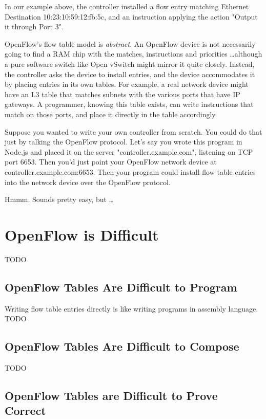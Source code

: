 In our example above, the controller installed a flow entry matching Ethernet Destination 10:23:10:59:12:fb:5c, 
and an instruction applying the action "Output it through Port 3".

OpenFlow's flow table model is \textit{abstract}.
An OpenFlow device is not necessarily going to find a RAM chip with the matches, 
instructions and priorities \ldots although a pure software switch like Open vSwitch might mirror it quite closely.
Instead, the controller asks the device to install entries, and the device accommodates it by placing entries in its
own tables.
For example, a real network device might have an L3 table that matches subnets with the various ports that have
IP gateways.
A programmer, knowing this table exists, can write instructions that match on those ports, and place it directly in the
table accordingly.

Suppose you wanted to write your own controller from scratch.  
You could do that just by talking the OpenFlow protocol.
Let's say you wrote this program in Node.js and placed it on the server "controller.example.com", 
listening on TCP port 6653.
Then you'd just point your OpenFlow network device at controller.example.com:6653.
Then your program could install flow table entries into the network device over the OpenFlow protocol.

Hmmm.
Sounds pretty easy, but \ldots

\section{OpenFlow is Difficult}

TODO

\subsection{OpenFlow Tables Are Difficult to Program}

Writing flow table entries directly is like writing programs in assembly language.
TODO

\subsection{OpenFlow Tables Are Difficult to Compose}

TODO

\subsection{OpenFlow Tables are Difficult to Prove Correct}

